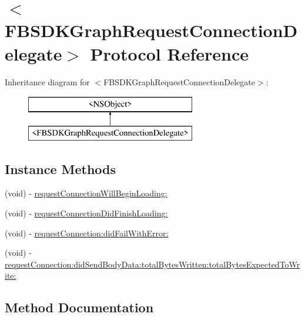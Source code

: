 \hypertarget{protocol_f_b_s_d_k_graph_request_connection_delegate-p}{}\section{$<$F\+B\+S\+D\+K\+Graph\+Request\+Connection\+Delegate$>$ Protocol Reference}
\label{protocol_f_b_s_d_k_graph_request_connection_delegate-p}
Inheritance diagram for $<$F\+B\+S\+D\+K\+Graph\+Request\+Connection\+Delegate$>$\+:\begin{figure}[H]
\begin{center}
\leavevmode
\includegraphics[height=2.000000cm]{protocol_f_b_s_d_k_graph_request_connection_delegate-p}
\end{center}
\end{figure}
\subsection*{Instance Methods}
\begin{DoxyCompactItemize}
\item 
(void) -\/ \hyperlink{protocol_f_b_s_d_k_graph_request_connection_delegate-p_a54173754894dff5ec20c68afccecdc2e}{request\+Connection\+Will\+Begin\+Loading\+:}
\item 
(void) -\/ \hyperlink{protocol_f_b_s_d_k_graph_request_connection_delegate-p_a486441eb843cc4b8e6124e30f6cea3ff}{request\+Connection\+Did\+Finish\+Loading\+:}
\item 
(void) -\/ \hyperlink{protocol_f_b_s_d_k_graph_request_connection_delegate-p_a94633c21d5335b826aa4d6fa4082f129}{request\+Connection\+:did\+Fail\+With\+Error\+:}
\item 
(void) -\/ \hyperlink{protocol_f_b_s_d_k_graph_request_connection_delegate-p_a184a50d9e9b357f1e9a927d810ba4b15}{request\+Connection\+:did\+Send\+Body\+Data\+:total\+Bytes\+Written\+:total\+Bytes\+Expected\+To\+Write\+:}
\end{DoxyCompactItemize}


\subsection{Method Documentation}
\hypertarget{protocol_f_b_s_d_k_graph_request_connection_delegate-p_a94633c21d5335b826aa4d6fa4082f129}{}
